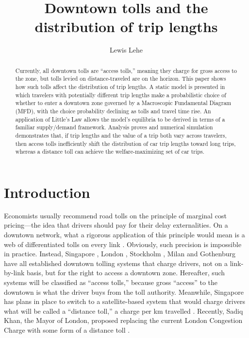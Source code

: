 \documentclass[preprint,authoryear]{elsarticle}
\begin{document}
\title{Downtown tolls and the distribution of trip lengths }

\author[ll]{Lewis Lehe }

\address[ll]{UC Berkeley, Department of Civil and Environmental Engineering \\ lewis500@berkeley.edu \\ http://lewislehe.com}

\begin{abstract}

Currently, all downtown tolls are ``access tolls,'' meaning they charge for gross access to the zone, but tolls levied on distance-traveled are on the horizon. This paper shows how such tolls affect the distribution of trip lengths. A static model is presented in which travelers with potentially different trip lengths make a probabilistic choice of whether to enter a downtown zone governed by a Macroscopic Fundamental Diagram (MFD), with the choice probability declining as tolls and travel time rise. An application of Little's Law allows the model's equilibria to be derived in terms of a familiar supply/demand framework. Analysis proves and numerical simulation demonstrates that, if trip lengths and the value of a trip both vary across travelers, then access tolls inefficiently shift the distribution of car trip lengths toward long trips, whereas a distance toll can achieve the welfare-maximizing set of car trips.

\end{abstract}
\maketitle

\section{Introduction}

Economists usually recommend road tolls on the principle of marginal cost pricing---the idea that drivers should pay for their delay externalities. On a downtown network, what a rigorous application of this principle would mean is a web of differentiated tolls on every link \citep{Beckmann1956,YangHuang1998}. Obviously, such precision is impossible in practice. Instead,  Singapore \citep{Santos2004}, London \citep{santos2008,Leape2006}, Stockholm \citep{Eliasson2014}, Milan \citep{Gibson2015} and Gothenburg \citep{Borjesson2015} have all established downtown tolling systems that charge drivers, not on a link-by-link basis, but for the right to access a downtown zone. Hereafter, such systems will be classified as ``access tolls,'' because gross ``access'' to the downtown is what the driver buys from the toll authority. Meanwhile, Singapore has plans in place to switch to a satellite-based system that would charge drivers what will be called a ``distance toll,'' a charge per km travelled \citep{Tan2016}. Recently, Sadiq Khan, the Mayor of London, proposed replacing the current London Congestion Charge with some form of a distance toll \citep{Topham2017}.
\end{document}
